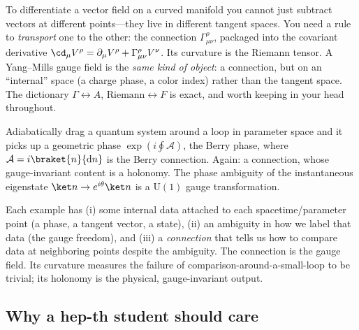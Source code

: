 \documentclass[11pt]{article}
\newcommand{\dd}{\mathrm{d}}                 %
\newcommand{\Uone}{\mathrm{U}(1)}
\begin{document}
\begin{eexample}
To differentiate a vector field on a curved manifold you cannot just subtract vectors
at different points---they live in different tangent spaces. You need a rule to
\emph{transport} one to the other: the connection $\Gamma^\rho_{\mu\nu}$, packaged into
the covariant derivative $\cd_\mu V^\rho = \partial_\mu V^\rho + \Gamma^\rho_{\mu\nu}V^\nu$.
Its curvature is the Riemann tensor. A Yang--Mills gauge field is the \emph{same kind
of object}: a connection, but on an ``internal'' space (a charge phase, a color index)
rather than the tangent space. The dictionary $\Gamma \leftrightarrow A$,
$\text{Riemann}\leftrightarrow F$ is exact, and worth keeping in your head throughout.
\end{eexample}

\begin{eexample}
Adiabatically drag a quantum system around a loop in parameter space and it picks up a
geometric phase $\exp(i\oint \mathcal{A})$, the Berry phase, where
$\mathcal{A} = i\braket{n}{\dd n}$ is the Berry connection. Again: a connection, whose
gauge-invariant content is a holonomy. The phase ambiguity of the instantaneous
eigenstate $\ket n \to e^{i\theta}\ket n$ is a $\Uone$ gauge transformation.
\end{eexample}

\begin{iintuition}
Each example has (i) some internal data attached to each spacetime/parameter point
(a phase, a tangent vector, a state), (ii) an ambiguity in how we label that data
(the gauge freedom), and (iii) a \emph{connection} that tells us how to compare data
at neighboring points despite the ambiguity. The connection is the gauge field. Its
curvature measures the failure of comparison-around-a-small-loop to be trivial; its
holonomy is the physical, gauge-invariant output.
\end{iintuition}

\subsection{Why a hep-th student should care}
\end{document}
